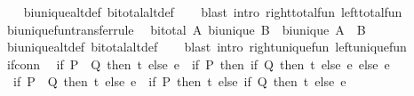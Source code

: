 \begin{isabellebody}
%
\isadelimproof
\ \ %
\endisadelimproof
%
\isatagproof
{}\isamarkupfalse%
\ bi{\isacharunderscore}{\kern0pt}unique{\isacharunderscore}{\kern0pt}alt{\isacharunderscore}{\kern0pt}def\ bi{\isacharunderscore}{\kern0pt}total{\isacharunderscore}{\kern0pt}alt{\isacharunderscore}{\kern0pt}def\isanewline
\ \ \isamarkupfalse%
\ {\isacharparenleft}{\kern0pt}blast\ intro{\isacharcolon}{\kern0pt}\ right{\isacharunderscore}{\kern0pt}total{\isacharunderscore}{\kern0pt}fun\ left{\isacharunderscore}{\kern0pt}total{\isacharunderscore}{\kern0pt}fun{\isacharparenright}{\kern0pt}%
\endisatagproof
{\isafoldproof}%
%
\isadelimproof
\isanewline
%
\endisadelimproof
\isanewline
{}\isamarkupfalse%
\ bi{\isacharunderscore}{\kern0pt}unique{\isacharunderscore}{\kern0pt}fun{\isacharbrackleft}{\kern0pt}transfer{\isacharunderscore}{\kern0pt}rule{\isacharbrackright}{\kern0pt}{\isacharcolon}{\kern0pt}\isanewline
\ \ {\isachardoublequoteopen}{\isasymlbrakk}bi{\isacharunderscore}{\kern0pt}total\ A{\isacharsemicolon}{\kern0pt}\ bi{\isacharunderscore}{\kern0pt}unique\ B{\isasymrbrakk}\ {\isasymLongrightarrow}\ bi{\isacharunderscore}{\kern0pt}unique\ {\isacharparenleft}{\kern0pt}A\ {\isacharequal}{\kern0pt}{\isacharequal}{\kern0pt}{\isacharequal}{\kern0pt}{\isachargreater}{\kern0pt}\ B{\isacharparenright}{\kern0pt}{\isachardoublequoteclose}\isanewline
%
\isadelimproof
\ \ %
\endisadelimproof
%
\isatagproof
{}\isamarkupfalse%
\ bi{\isacharunderscore}{\kern0pt}unique{\isacharunderscore}{\kern0pt}alt{\isacharunderscore}{\kern0pt}def\ bi{\isacharunderscore}{\kern0pt}total{\isacharunderscore}{\kern0pt}alt{\isacharunderscore}{\kern0pt}def\isanewline
\ \ \isamarkupfalse%
\ {\isacharparenleft}{\kern0pt}blast\ intro{\isacharcolon}{\kern0pt}\ right{\isacharunderscore}{\kern0pt}unique{\isacharunderscore}{\kern0pt}fun\ left{\isacharunderscore}{\kern0pt}unique{\isacharunderscore}{\kern0pt}fun{\isacharparenright}{\kern0pt}%
\endisatagproof
{\isafoldproof}%
%
\isadelimproof
\isanewline
%
\endisadelimproof
\isanewline
{}\isamarkupfalse%
\isanewline
\isanewline
{}\isamarkupfalse%
\ if{\isacharunderscore}{\kern0pt}conn{\isacharcolon}{\kern0pt}\isanewline
\ \ {\isachardoublequoteopen}{\isacharparenleft}{\kern0pt}if\ P\ {\isasymand}\ Q\ then\ t\ else\ e{\isacharparenright}{\kern0pt}\ {\isacharequal}{\kern0pt}\ {\isacharparenleft}{\kern0pt}if\ P\ then\ if\ Q\ then\ t\ else\ e\ else\ e{\isacharparenright}{\kern0pt}{\isachardoublequoteclose}\isanewline
\ \ {\isachardoublequoteopen}{\isacharparenleft}{\kern0pt}if\ P\ {\isasymor}\ Q\ then\ t\ else\ e{\isacharparenright}{\kern0pt}\ {\isacharequal}{\kern0pt}\ {\isacharparenleft}{\kern0pt}if\ P\ then\ t\ else\ if\ Q\ then\ t\ else\ e{\isacharparenright}{\kern0pt}{\isachardoublequoteclose}\isanewline

\end{isabellebody}
